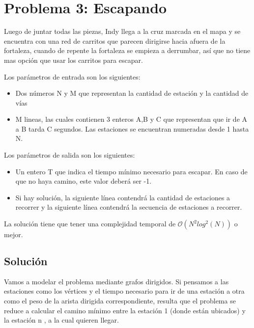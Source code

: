 \section{Problema 3: Escapando}

Luego de juntar todas las piezas, Indy llega a la cruz marcada en el mapa y se encuentra con una red de carritos que parecen dirigirse hacia afuera de la fortaleza, cuando de repente la fortaleza se empieza a derrumbar, así que no tiene mas opción que usar los carritos para escapar.

Los parámetros de entrada son los siguientes:

        \begin{itemize}
        \item Dos números N y M que representan la cantidad de estación y la cantidad de vías
        \item M lineas, las cuales contienen 3 enteros A,B y C que representan que ir de A a B tarda C segundos. Las estaciones se encuentran numeradas desde 1 hasta N.
        \end{itemize}

Los parámetros de salida son los siguientes:

    \begin{itemize}
    \item Un entero T que indica el tiempo mínimo necesario para escapar. En caso de que no haya camino, este valor deberá ser -1.
    \item Si hay solución, la siguiente línea contendrá la cantidad de estaciones a recorrer y la siguiente línea contendrá la secuencia de estaciones a recorrer.
    \end{itemize}


La solución tiene que tener una complejidad temporal de $\mathcal{O}(N^{2}log^{2}(N))$ o mejor.

\subsection{Solución}

Vamos a modelar el problema mediante grafos dirigidos. Si pensamos a las estaciones como los vértices y el tiempo necesario para ir de una estación a otra como el peso de la arista dirigida correspondiente, resulta que el problema se reduce a calcular el camino mínimo entre la estación 1 (donde están ubicados) y la estación n , a la cual quieren llegar.

